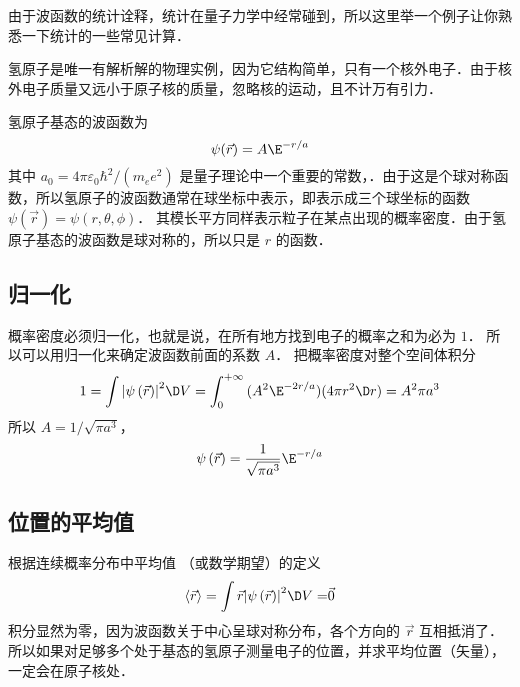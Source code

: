 

由于波函数的统计诠释，统计在量子力学中经常碰到，所以这里举一个例子让你熟悉一下统计的一些常见计算．

氢原子是唯一有解析解的物理实例，因为它结构简单，只有一个核外电子．由于核外电子质量又远小于原子核的质量，忽略核的运动，且不计万有引力．

氢原子基态的波函数为
\begin{equation}
\psi(\vec r) = A\E^{-r/a}
\end{equation}
其中 ${a_0} = {{4\pi {\varepsilon_0}{\hbar ^2}}}/({{{m_e}{e^2}}})$ 是量子理论中一个重要的常数，．由于这是个球对称函数，所以氢原子的波函数通常在球坐标中表示，即表示成三个球坐标的函数 $\psi \left( {\vec r} \right) = \psi \left( {r,\theta ,\phi } \right)$． 其模长平方同样表示粒子在某点出现的概率密度．由于氢原子基态的波函数是球对称的，所以只是 $r$ 的函数．

\subsection{归一化}
  
概率密度必须归一化，也就是说，在所有地方找到电子的概率之和为必为 $1$． 所以可以用归一化来确定波函数前面的系数 $A$． 把概率密度对整个空间体积分
\begin{equation}
    1 = \int {{{\left| {\psi \left( {\vec r} \right)} \right|}^2} \D V}  = \int_0^{ + \infty } {(A^2 \E^{-2r/a})(4\pi r^2\D r)}  = {A^2}\pi {a^3}
\end{equation}
所以 $A = {1}/{{\sqrt {\pi {a^3}} }}$， 
\begin{equation}
\psi \left( {\vec r} \right) = \frac{1}{\sqrt {\pi {a^3}} }{\E^{-r/a}}
\end{equation}

\subsection{位置的平均值}

 根据连续概率分布中平均值%
（或数学期望）的定义
\begin{equation}
\left\langle {\vec r} \right\rangle  = \int {\vec r{{\left| {\psi \left( {\vec r} \right)} \right|}^2} \D V = } \vec 0
\end{equation}
积分显然为零，因为波函数关于中心呈球对称分布，各个方向的 $\vec r$ 互相抵消了．所以如果对足够多个处于基态的氢原子测量电子的位置，并求平均位置（矢量）， 一定会在原子核处．

